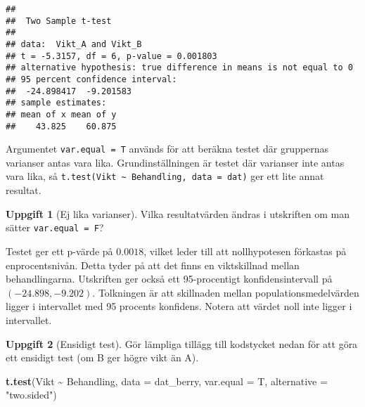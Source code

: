\documentclass[
]{book}
\newenvironment{Shaded}{\begin{snugshade}}{\end{snugshade}}
\newcommand{\AttributeTok}[1]{\textcolor[rgb]{0.13,0.29,0.53}{#1}}
\newcommand{\CommentTok}[1]{\textcolor[rgb]{0.56,0.35,0.01}{\textit{#1}}}
\newcommand{\DocumentationTok}[1]{\textcolor[rgb]{0.56,0.35,0.01}{\textbf{\textit{#1}}}}
\newcommand{\FunctionTok}[1]{\textcolor[rgb]{0.13,0.29,0.53}{\textbf{#1}}}
\newcommand{\NormalTok}[1]{#1}
\newcommand{\OtherTok}[1]{\textcolor[rgb]{0.56,0.35,0.01}{#1}}
\newcommand{\SpecialCharTok}[1]{\textcolor[rgb]{0.81,0.36,0.00}{\textbf{#1}}}
\newcommand{\StringTok}[1]{\textcolor[rgb]{0.31,0.60,0.02}{#1}}
\theoremstyle{definition}
\theoremstyle{definition}
\theoremstyle{definition}
\newtheorem{exercise}{Uppgift}[chapter]
\theoremstyle{definition}
\theoremstyle{remark}
\begin{document}
\begin{Shaded}
\end{Shaded}

\begin{verbatim}
## 
##  Two Sample t-test
## 
## data:  Vikt_A and Vikt_B
## t = -5.3157, df = 6, p-value = 0.001803
## alternative hypothesis: true difference in means is not equal to 0
## 95 percent confidence interval:
##  -24.898417  -9.201583
## sample estimates:
## mean of x mean of y 
##    43.825    60.875
\end{verbatim}

Argumentet \texttt{var.equal\ =\ T} används för att beräkna testet där gruppernas varianser antas vara lika. Grundinställningen är testet där varianser inte antas vara lika, så \texttt{t.test(Vikt\ \textasciitilde{}\ Behandling,\ data\ =\ dat)} ger ett lite annat resultat.

\begin{exercise}[Ej lika varianser]
Vilka resultatvärden ändras i utskriften om man sätter \texttt{var.equal\ =\ F}?
\end{exercise}

Testet ger ett p-värde på \(0.0018\), vilket leder till att nollhypotesen förkastas på enprocentsnivån. Detta tyder på att det finns en viktskillnad mellan behandlingarna. Utskriften ger också ett 95-procentigt konfidensintervall på \((-24.898, -9.202)\). Tolkningen är att skillnaden mellan populationsmedelvärden ligger i intervallet med 95 procents konfidens. Notera att värdet noll inte ligger i intervallet.

\begin{exercise}[Ensidigt test]

Gör lämpliga tillägg till kodstycket nedan för att göra ett ensidigt test (om B ger högre vikt än A).

\begin{Shaded}
\begin{Highlighting}[]
\FunctionTok{t.test}\NormalTok{(Vikt }\SpecialCharTok{\textasciitilde{}}\NormalTok{ Behandling, }\AttributeTok{data =}\NormalTok{ dat\_berry, }\AttributeTok{var.equal =}\NormalTok{ T, }\AttributeTok{alternative =} \StringTok{"two.sided"}\NormalTok{)}
\end{Highlighting}
\end{Shaded}

\end{exercise}
\end{document}

